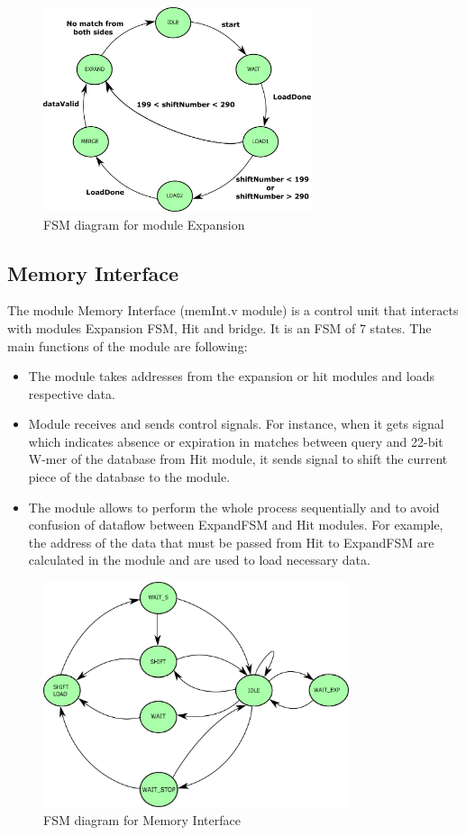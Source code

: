 \begin{figure}[t!]
\centering
\includegraphics[width=0.7\textwidth]{Figures/expandFSM.pdf}
\caption{FSM diagram for module Expansion} \label{fig:expandFSM}
\end{figure}
       
       
\subsection{Memory Interface}
\quad The module Memory Interface (memInt.v module) is a control unit that interacts with modules Expansion FSM, Hit and bridge. It is an FSM of 7 states. The main functions of the module are following:
\begin{itemize}
\item The module takes addresses from the expansion or hit modules and loads respective data.
\item Module receives and sends control signals. For instance, when it gets signal which indicates absence or expiration in matches between query and 22-bit W-mer of the database from Hit module, it sends signal to shift the current piece of the database to the module.
\item The module allows to perform the whole process sequentially and to avoid confusion of dataflow between ExpandFSM and Hit modules. For example, the address of the data that must be passed from Hit to ExpandFSM are calculated in the module and are used to load necessary data.
\end{itemize}

\begin{figure}
\centering
\includegraphics[width=0.8\textwidth]{Figures/FSM_Mem_New.pdf}
\caption{FSM diagram for Memory Interface} \label{fig:MemInt}
\end{figure}


